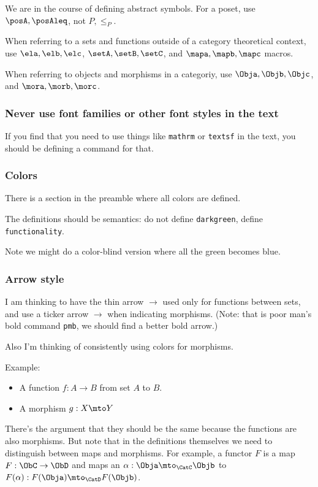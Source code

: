 We are in the course of defining abstract symbols.
For a poset, use $\posA,\posAleq$, not $P,\leq_P$.

When referring to a sets and functions outside of a category theoretical context,   use $\ela,\elb,\elc$, $\setA,\setB,\setC$, and $\mapa,\mapb,\mapc$ macros.

When referring to objects and morphisms in a categoriy,   use $\Obja,\Objb,\Objc$, and $\mora,\morb,\morc$.

\subsubsection*{Never use font families or other font styles in the text}

If you find that you need to use things like \texttt{mathrm} or \texttt{textsf} in the text, you should be defining a command for that.

\subsubsection*{Colors}

There is a section in the preamble where all colors are defined.

The definitions should be semantics: do not define \texttt{darkgreen}, define \texttt{functionality}.

Note we might do a color-blind version where all the green becomes blue.

\subsubsection*{Arrow style}

I am thinking to have the thin arrow $\to$ used only for functions between sets, and use a ticker arrow $\pmb{\to}$ when indicating morphisms.
(Note: that is poor man's bold command \texttt{pmb}, we should find a better bold arrow.)

Also I'm thinking of consistently using colors for morphisms.

Example:
\begin{itemize}
    \item A function $f: A \to B$ from set $A$ to $B$.
    \item A morphism $g: X \mto  Y$
\end{itemize}

There's the argument that they should be the same because the functions are also morphisms.
But note that in the definitions themselves we need to distinguish between maps and morphisms.
For example, a functor $F$ is a map $F: \ObC \to \ObD$ and maps an $\alpha: \Obja \mto_{\CatC} \Objb $ to $F(\alpha): F(\Obja) \mto_{\CatD} F(\Objb) $.

